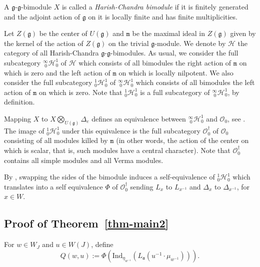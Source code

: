 \documentclass[a4paper]{amsart}
\begin{document}
A $\mathfrak{g}$-$\mathfrak{g}$-bimodule $X$ is called a
{\em Harish-Chandra bimodule} if it is finitely generated
and the adjoint action of $\mathfrak{g}$ on it is locally finite
and has finite multiplicities. 

Let $Z(\mathfrak{g})$ be the center of $U(\mathfrak{g})$
and $\mathtt{m}$ be the maximal ideal in $Z(\mathfrak{g})$
given by the kernel of the action of $Z(\mathfrak{g})$ on 
the trivial $\mathfrak{g}$-module. We denote by $\mathcal{H}$
the category of all Harish-Chandra $\mathfrak{g}$-$\mathfrak{g}$-bimodules.
As usual, we consider the full subcategory 
${}^{\infty}_{\,\,0}\mathcal{H}^1_0$ of 
$\mathcal{H}$ which consists of all bimodules the right action of
$\mathtt{m}$ on which is zero and the left action of 
$\mathtt{m}$ on which is locally nilpotent.
We also consider the full subcategory 
${}^{1}_{0}\mathcal{H}^1_0$ of 
${}^{\infty}_{\,\,0}\mathcal{H}^1_0$ which consists of all 
bimodules the left action of 
$\mathtt{m}$ on which is zero. Note that 
${}^{1}_{0}\mathcal{H}^1_0$ is a full subcategory of 
${}^{\infty}_{\,\,0}\mathcal{H}^1_0$, by definition.

Mapping $X$ to $\displaystyle X\bigotimes_{U(\mathfrak{g})}\Delta_e$
defines an equivalence between ${}^{\infty}_{\,\,0}\mathcal{H}^1_0$
and $\mathcal{O}_0$, see \cite[Theorem~5.9]{BG}. The image of
${}^{1}_{0}\mathcal{H}^1_0$ under this equivalence is the full
subcategory ${\mathcal{O}}_0^\dagger$ of $\mathcal{O}_0$ consisting
of all modules killed by $\mathtt{m}$ (in other words, the action of
the center on which is scalar, that is, such modules have a central character).
Note that ${\mathcal{O}}_0^\dagger$ contains all simple modules
and all Verma modules.

By \cite[Theoreme~1]{So86}, swapping the sides of the bimodule
induces a self-equivalence of ${}^{1}_{0}\mathcal{H}^1_0$ which
translates into a self equivalence $\Phi$ of ${\mathcal{O}}_0^\dagger$
sending $L_x$ to $L_{x^{-1}}$ and $\Delta_x$ to $\Delta_{x^{-1}}$,
for $x\in W$. 

\subsection{Proof of Theorem~\ref{thm-main2}}\label{s4.4}

For $w\in W_J$ and $u\in W(J)$, define 
\begin{displaymath}
Q(w,u):=
\Phi(\mathrm{Ind}_{\eta_{w^{-1}}}(L_\mathfrak{a}(u^{-1}\cdot \mu_{w^{-1}}))).
\end{displaymath}
\end{document}
